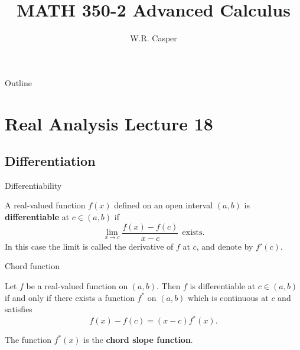 \documentclass{beamer}
\title{MATH 350-2 Advanced Calculus}
\subtitle
{} %
\author[W.R. Casper] %
{W.R. Casper}
\institute[California State University Fullerton] %
{
  Department of Mathematics\\
  California State University Fullerton}
\begin{document}
\begin{frame}
  \titlepage
\end{frame}

\begin{frame}{Outline}
  \tableofcontents
\end{frame}



\section{Real Analysis Lecture 18}

\subsection{Differentiation}

\begin{frame}{Differentiability}
\begin{defn}
A real-valued function $f(x)$ defined on an open interval $(a,b)$ is \textbf{differentiable} at $c\in (a,b)$ if
$$\lim_{x\rightarrow c}\frac{f(x)-f(c)}{x-c}\ \ \text{exists}.$$
In this case the limit is called the derivative of $f$ at $c$, and denote by $f'(c)$.
\end{defn}
\end{frame}

\begin{frame}{Chord function}
\begin{thm}
Let $f$ be a real-valued function on $(a,b)$.  Then $f$ is differentiable at $c\in (a,b)$ if and only if there exists a function $f^*$ on $(a,b)$ which is continuous at $c$ and satisfies
$$f(x)-f(c) = (x-c)f^*(x).$$
\end{thm}
\pause
The function $f^*(x)$ is the \textbf{chord slope function}.
\end{frame}
\end{document}
